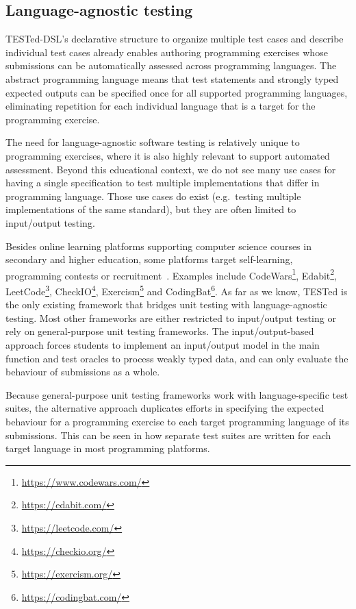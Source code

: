 \documentclass[../main]{subfiles}
\begin{document}
\subsection{Language-agnostic testing}\label{subsec:language-agnostic-testing}

TESTed-DSL's declarative structure to organize multiple test cases and describe individual test cases already enables authoring programming exercises whose submissions can be automatically assessed across programming languages.
The abstract programming language means that test statements and strongly typed expected outputs can be specified once for all supported programming languages, eliminating repetition for each individual language that is a target for the programming exercise.

The need for language-agnostic software testing is relatively unique to programming exercises, where it is also highly relevant to support automated assessment.
Beyond this educational context, we do not see many use cases for having a single specification to test multiple implementations that differ in programming language.
Those use cases do exist (e.g.\ testing multiple implementations of the same standard), but they are often limited to input/output testing.

Besides online learning platforms supporting computer science courses in secondary and higher education, some platforms target self-learning, programming contests or recruitment~\autocite{hidalgo-cespedesEvaluationOnlineJudge2023}.
Examples include CodeWars\footnote{\url{https://www.codewars.com/}}, Edabit\footnote{\url{https://edabit.com/}}, LeetCode\footnote{\url{https://leetcode.com/}}, CheckIO\footnote{\url{https://checkio.org/}}, Exercism\footnote{\url{https://exercism.org/}} and CodingBat\footnote{\url{https://codingbat.com/}}.
As far as we know, TESTed is the only existing framework that bridges unit testing with language-agnostic testing.
Most other frameworks are either restricted to input/output testing or rely on general-purpose unit testing frameworks.
The input/output-based approach forces students to implement an input/output model in the main function and test oracles to process weakly typed data, and can only evaluate the behaviour of submissions as a whole.

Because general-purpose unit testing frameworks work with language-specific test suites, the alternative approach duplicates efforts in specifying the expected behaviour for a programming exercise to each target programming language of its submissions.
This can be seen in how separate test suites are written for each target language in most programming platforms.
\end{document}
